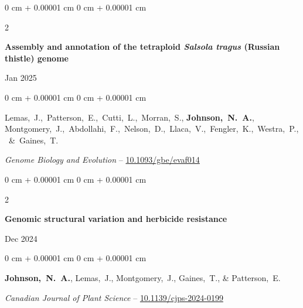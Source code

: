 \documentclass[10pt, letterpaper]{article}
\newenvironment{onecolentry}{
    \begin{adjustwidth}{
        0 cm + 0.00001 cm
    }{
        0 cm + 0.00001 cm
    }
}{
    \end{adjustwidth}
} %
\newenvironment{twocolentry}[2][]{
    \onecolentry
    \def\secondColumn{#2}
    \setcolumnwidth{\fill, 4.5 cm}
    \begin{paracol}{2}
}{
    \switchcolumn \raggedleft \secondColumn
    \end{paracol}
    \endonecolentry
} %
\begin{document}
        \vspace{0.2 cm}

        
        \begin{samepage}
            \begin{twocolentry}{
                Jan 2025
                }
                \textbf{Assembly and annotation of the tetraploid \textit{Salsola tragus} (Russian thistle) genome}
            \end{twocolentry}

            \vspace{0.10 cm}
            
            \begin{onecolentry}
                \mbox{Lemas, J., Patterson, E., Cutti, L., Morran, S.,} \mbox{\textbf{Johnson, N. A.}},
                \mbox{Montgomery, J., Abdollahi, F., Nelson, D., Llaca, V., Fengler, K., Westra, P., \& Gaines, T.}

                \vspace{0.10 cm}
                
                \textit{Genome Biology and Evolution} -- \href{https://doi.org/10.1093/gbe/evaf014}{10.1093/gbe/evaf014}
            \end{onecolentry}
        \end{samepage}


        \vspace{0.2 cm}


        \begin{samepage}
            \begin{twocolentry}{
                Dec 2024
                }
                \textbf{Genomic structural variation and herbicide resistance}
            \end{twocolentry}

            \vspace{0.10 cm}
            
            \begin{onecolentry}
                \mbox{\textbf{Johnson, N. A.}}, \mbox{Lemas, J.}, \mbox{Montgomery, J.}, \mbox{Gaines, T.}, \& \mbox{Patterson, E.}

                \vspace{0.10 cm}
                
                \textit{Canadian Journal of Plant Science} -- \href{https://doi.org/10.1139/cjps-2024-0199}{10.1139/cjps-2024-0199}
            \end{onecolentry}
        \end{samepage}
\end{document}
